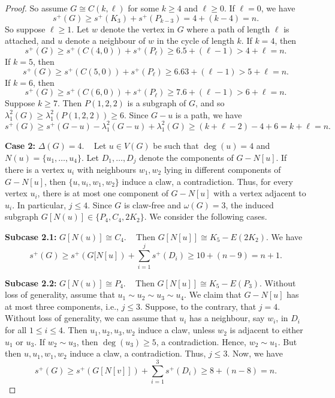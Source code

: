 \documentclass{article}
\begin{document}
\begin{proof}
So assume $G\cong C(k,\ell)$ for some $k\ge 4$ and $\ell \ge 0$. If $\ell = 0$, we have 
\[s^+(G)\ge s^+(K_3)+s^+(P_{k-3})=4+(k-4) = n.\] So suppose $\ell \ge 1$. Let $w$ denote the vertex in $G$ where a path of length $\ell$ is attached, and $u$ denote a neighbour of $w$ in the cycle of length $k$. If $k=4$, then 
\[s^+(G)\ge s^+(C(4,0)) + s^+(P_\ell)\ge 6.5 + (\ell - 1) > 4 + \ell = n.\]
If $k=5$, then 
\[s^+(G)\ge s^+(C(5,0)) + s^+(P_\ell)\ge 6.63 + (\ell - 1) > 5 + \ell = n.\]
If $k=6$, then 
\[s^+(G)\ge s^+(C(6,0)) + s^+(P_\ell)\ge 7.6 + (\ell - 1) > 6 + \ell = n.\]
Suppose $k\ge 7$. Then $P(1, 2, 2)$ is a subgraph of $G$, and so $\lambda_1^2(G)\ge \lambda_1^2(P(1,2,2))\ge 6.$ Since $G-u$ is a path, we have 
\[s^+(G)\ge s^+(G-u)-\lambda_1^2(G-u) + \lambda_1^2(G) \ge (k+\ell-2)- 4 +6 = k + \ell = n.\]

\textbf{Case 2:} $\Delta(G)=4$. ~
Let $u\in V(G)$ be such that $\deg(u)=4$ and $N(u) = \{u_1, \ldots, u_4\}.$ Let $D_1, \ldots, D_j$ denote the components of $G-N[u]$. If there is a vertex $u_i$ with neighbours $w_1, w_2$ lying in different components of $G-N[u]$, then $\{u, u_i, w_1, w_2\}$ induce a claw, a contradiction. Thus, for every vertex $u_i$, there is at most one component of $G-N[u]$ with a vertex adjacent to $u_i$. In particular, $j\le 4$. Since $G$ is claw-free and $\omega(G)=3$, the induced subgraph $G[N(u)]\in \{P_4, C_4, 2K_2\}$. We consider the following cases.

\textbf{Subcase 2.1:} $G[N(u)]\cong C_4$. ~ Then $G[N[u]]\cong K_5 - E(2K_2)$. We have 
\[ s^+(G) \ge s^+(G[N[u]) + \sum_{i=1}^j s^+(D_i) \ge 10 + (n-9) = n+1.\]

\textbf{Subcase 2.2:} $G[N(u)]\cong P_4$. ~ Then $G[N[u]]\cong K_5 - E(P_3)$. Without loss of generality, assume that $u_1\sim u_2\sim u_3\sim u_4$. We claim that $G-N[u]$ has at most three components, i.e., $j\le 3$. Suppose, to the contrary, that $ j=4$. Without loss of generality, we can assume that $u_i$ has a neighbour, say $w_i$, in $D_i$ for all $1\le i\le 4$. Then $u_1, u_2, u_3, w_2$ induce a claw, unless $w_2$ is adjacent to either $u_1$ or $u_3$. If $w_2\sim u_3$, then $\deg(u_3)\ge 5$, a contradiction. Hence, $w_2\sim u_1$. But then $u, u_1, w_1, w_2$ induce a claw, a contradiction. Thus, $j\le 3$. Now, we have 
\[ s^+(G) \ge s^+(G[N[v]]) + \sum_{i=1}^3s^+(D_i)\ge 8 + (n-8) = n.\]


\end{proof}
\end{document}

